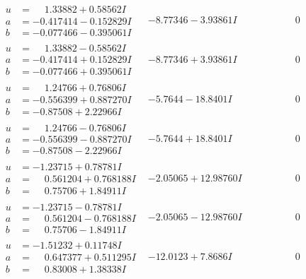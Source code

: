 \documentclass[1p]{elsarticle_modified}
\theoremstyle{definition}
\begin{document}
$$\begin{array}{c|c|c}
\begin{aligned}
u &= \phantom{-}1.33882 + 0.58562 I \\
a &= -0.417414 - 0.152829 I \\
b &= -0.077466 - 0.395061 I\end{aligned}
 & -8.77346 - 3.93861 I & \phantom{-0.000000 } 0 \\ \hline\begin{aligned}
u &= \phantom{-}1.33882 - 0.58562 I \\
a &= -0.417414 + 0.152829 I \\
b &= -0.077466 + 0.395061 I\end{aligned}
 & -8.77346 + 3.93861 I & \phantom{-0.000000 } 0 \\ \hline\begin{aligned}
u &= \phantom{-}1.24766 + 0.76806 I \\
a &= -0.556399 + 0.887270 I \\
b &= -0.87508 + 2.22966 I\end{aligned}
 & -5.7644 - 18.8401 I & \phantom{-0.000000 } 0 \\ \hline\begin{aligned}
u &= \phantom{-}1.24766 - 0.76806 I \\
a &= -0.556399 - 0.887270 I \\
b &= -0.87508 - 2.22966 I\end{aligned}
 & -5.7644 + 18.8401 I & \phantom{-0.000000 } 0 \\ \hline\begin{aligned}
u &= -1.23715 + 0.78781 I \\
a &= \phantom{-}0.561204 + 0.768188 I \\
b &= \phantom{-}0.75706 + 1.84911 I\end{aligned}
 & -2.05065 + 12.98760 I & \phantom{-0.000000 } 0 \\ \hline\begin{aligned}
u &= -1.23715 - 0.78781 I \\
a &= \phantom{-}0.561204 - 0.768188 I \\
b &= \phantom{-}0.75706 - 1.84911 I\end{aligned}
 & -2.05065 - 12.98760 I & \phantom{-0.000000 } 0 \\ \hline\begin{aligned}
u &= -1.51232 + 0.11748 I \\
a &= \phantom{-}0.647377 + 0.511295 I \\
b &= \phantom{-}0.83008 + 1.38338 I\end{aligned}
 & -12.0123 + 7.8686 I & \phantom{-0.000000 } 0 \\ \hline\begin{aligned}

\end{aligned}
\end{array}$$
\end{document}

